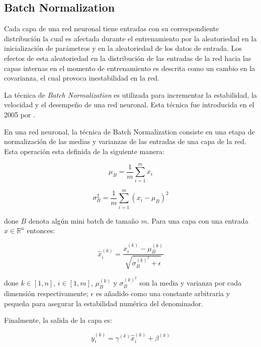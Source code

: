 	\subsection{Batch Normalization}

	Cada capa de una red neuronal tiene entradas con su correspondiente distribución la cual es afectada durante el entrenamiento por la aleatoriedad en la inicialización de parámetros y en la aleatoriedad de los datos de entrada. Los efectos de esta aleatoriedad en la distribución de las entradas de la red hacia las capas internas en el momento de entrenamiento es descrita como un cambio en la covarianza, el cual provoca inestabilidad en la red.
	
	La técnica de \textit{Batch Normalization} es utilizada para incrementar la estabilidad, la velocidad y el desempeño de una red neuronal. Esta técnica fue introducida en el 2005 por \cite{batch-normalization}.

	En una red neuronal, la técnica de Batch Normalization consiste en una etapa de normalización de las medias y varianzas de las entradas de una capa de la red. Esta operación esta definida de la siguiente manera:

	\begin{equation}
		\mu_{B} = \frac{1}{m} \sum_{i=1}^{m} x_{i} 
	\end{equation}

	\begin{equation}
		\sigma_{B}^{2} = \frac{1}{m} \sum_{i=1}^{m} (x_{i} - \mu_{B})^{2}
	\end{equation}

	done $B$ denota algún mini batch de tamaño $m$. Para una capa con una entrada $x \in \mathbb{R}^{n}$ entonces:

	\begin{equation}
		\hat{x}^{(k)}_{i} = \frac{x^{(k)}_{i} - \mu_{B}^{(k)}}{\sqrt{\sigma_{B}^{(k)^{2}} + \epsilon}}
	\end{equation}

	done $k \in [1, n]$, $i \in [1, m]$, $\mu_{B}^{(k)}$ y $\sigma_{B}^{(k)^{2}}$ son la media y varianza por cada dimensión respectivamente; $\epsilon$ es añadido como una constante arbitraria y pequeña para asegurar la estabilidad numérica del denominador.

	Finalmente, la salida de la capa es:

	\begin{equation}
		y^{(k)}_{i} = \gamma^{(k)} \hat{x}^{(k)}_{i} + \beta^{(k)}
	\end{equation}
    
